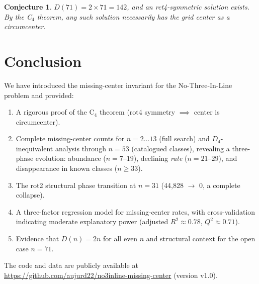 \documentclass[11pt,a4paper]{article}
\theoremstyle{plain}
\newtheorem{conjecture}[theorem]{Conjecture}
\theoremstyle{definition}
\begin{document}
\begin{conjecture}
$D(71)=2\times71=142$, and an rct4-symmetric solution exists. By the C$_4$ theorem, any such solution necessarily has the grid center as a circumcenter.
\end{conjecture}

\section{Conclusion}
\label{sec:conc}

We have introduced the missing-center invariant for the No-Three-In-Line problem and provided:
\begin{enumerate}[nosep]
\item A rigorous proof of the C$_4$ theorem (rot4 symmetry $\implies$ center is circumcenter).
\item Complete missing-center counts for $n=2\dots13$ (full search) and $D_4$-inequivalent analysis through $n=53$ (catalogued classes), revealing a three-phase evolution: abundance ($n=7$--$19$), declining \emph{rate} ($n=21$--$29$), and disappearance in known classes ($n\ge33$).
\item The rot2 structural phase transition at $n=31$ (44,828 $\to$ 0, a complete collapse).
\item A three-factor regression model for missing-center rates, with cross-validation indicating moderate explanatory power (adjusted $R^2\approx0.78$, $Q^2\approx0.71$).
\item Evidence that $D(n)=2n$ for all even $n$ and structural context for the open case $n=71$.
\end{enumerate}

The code and data are publicly available at \url{https://github.com/aujurd22/no3inline-missing-center} (version v1.0).



\end{document}
